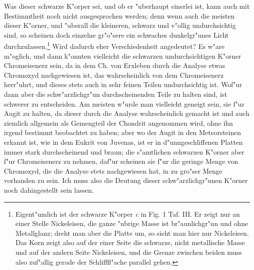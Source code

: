 \documentclass[a4paper, 11pt, oneside]{article}
\begin{document}
Was dieser schwarze K"orper sei, und ob er "uberhaupt einerlei ist, kann auch mit Bestimmtheit noch nicht ausgesprochen werden; denn wenn auch die meisten dieser K"orner, und "uberall die kleineren, schwarz und v"ollig undurchsichtig sind, so scheinen doch einzelne gr"o"sere ein schwaches dunkelgr"unes Licht durchzulassen.\footnote{Eigent"umlich ist der schwarze K"orper \emph{c} in Fig. 1 Taf. III. Er zeigt nur an einer Stelle Nickeleisen, die ganze "ubrige Masse ist br"aunlichgr"un und ohne Metallglanz; dreht man aber die Platte um, so sieht man hier nur Nickeleisen. Das Korn zeigt also auf der einer Seite die schwarze, nicht metallische Masse und auf der andern Seite Nickeleisen, und die Grenze zwischen beiden muss also zuf"allig gerade der Schlifffl"ache parallel gehen.} Wird dadurch eher Verschiedenheit angedeutet? Es w"are m"oglich, und dann k"onnten vielleicht die schwarzen undurchsichtigen K"orner Chromeisenerz sein, da in dem Ch. von Erxleben durch die Analyse etwas Chromoxyd nachgewiesen ist, das wahrscheinlich von dem Chromeisenerz herr"uhrt, und dieses stets auch in sehr feinen Teilen undurchsichtig ist. Wof"ur dann aber die schw"arzlichgr"un durchscheinenden Teile zu halten sind, ist schwerer zu entscheiden. Am meisten w"urde man vielleicht geneigt sein, sie f"ur Augit zu halten, da dieser durch die Analyse wahrscheinlich gemacht ist und auch ziemlich allgemein als Gemengteil der Chondrit angenommen wird, ohne ihn irgend bestimmt beobachtet zu haben; aber wo der Augit in den Meteorsteinen erkannt ist, wie in dem Eukrit von Juvenas, ist er in d"unngeschliffenen Platten immer stark durchscheinend und braun; die s"amtlichen schwarzen K"orner aber f"ur Chromeisenerz zu nehmen, daf"ur scheinen sie f"ur die geringe Menge von Chromoxyd, die die Analyse stets nachgewiesen hat, in zu gro"ser Menge vorhanden zu sein. Ich muss also die Deutung dieser schw"arzlichgr"unen K"orner noch dahingestellt sein lassen.
\end{document}

